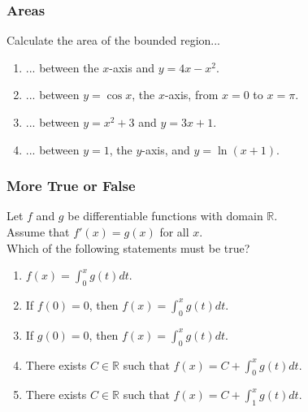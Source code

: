 \documentclass[14pt]{beamer}
\newcommand{\R}{\mathbb{R}}
\newcommand{\setsize}[1]{\fontsize{#1}{#1}\selectfont} %
\newcommand{\smallerfont}{\setsize{13}} %
\begin{document}
	\begin{frame}[t]
		\frametitle{Areas}

		Calculate the area of the bounded region...
		\vspace{.2cm}
		\begin{enumerate}
			\item ... between the $x$-axis and ${\displaystyle y=4x-x^2}$.
				\vspace{.2cm}

			\item ... between $y=\cos x$, the $x$-axis, from $x=0$ to $x=\pi$.
				\vspace{.2cm}

			\item ... between ${\displaystyle y=x^2+3}$ and ${\displaystyle y=3x+1}$.
				\vspace{.2cm}

			\item ... between $y=1$, the $y$-axis, and $y=\ln(x+1)$.
		\end{enumerate}
	\end{frame}
	\begin{frame}[t]
		\smallerfont
		\frametitle{More True or False}

		Let $f$ and $g$ be differentiable functions with domain ${\displaystyle \R}$.
		\\ Assume that ${\displaystyle f'(x) = g(x)}$ for all $x$. \\ Which of the
		following statements must be true?

		\begin{enumerate}
			\item ${\displaystyle f(x) = \int_0^x g(t) dt}$.

			\item If ${\displaystyle f(0)=0}$, then
				${\displaystyle f(x) = \int_0^x g(t) dt}$.

			\item If ${\displaystyle g(0)=0}$, then
				${\displaystyle f(x) = \int_0^x g(t) dt}$.

			\item There exists $C \in \mathbb{R}$ such that ${\displaystyle f(x) = C + \int_0^x g(t) dt}$.

			\item There exists $C\in \mathbb{R}$ such that ${\displaystyle f(x) = C + \int_1^x g(t) dt}$.
		\end{enumerate}
	\end{frame}
\end{document}
